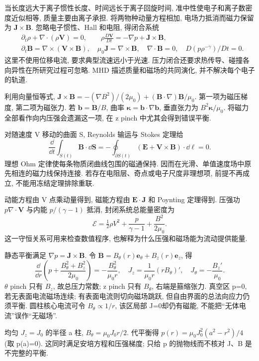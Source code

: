 \label{ch:ideal}
当长度远大于离子惯性长度、时间远长于离子回旋时间, 准中性使电子和离子数密度近似相等, 质量主要由离子承担. 将两物种动量方程相加, 电场力抵消而磁力保留为 $\mathbf J\times\mathbf B$. 忽略电子惯性、Hall 和电阻, 得闭合系统
\begin{align}
 &\partial_t\rho+\nabla\cdot(\rho\mathbf V)=0,\qquad
 \rho\frac{D\mathbf V}{Dt}=-\nabla p+\mathbf J\times\mathbf B,\\
 &\partial_t\mathbf B=\nabla\times(\mathbf V\times\mathbf B),\quad
 \mu_0\mathbf J=\nabla\times\mathbf B,\quad\nabla\cdot\mathbf B=0,\quad
 D(p\rho^{-\gamma})/Dt=0.
\end{align}
这里不使用位移电流, 要求典型流速远小于光速. 压力闭合还要求热传导、碰撞各向异性在所研究过程可忽略. MHD 描述质量和磁场的共同演化, 并不解决每个电子的轨道.

利用向量恒等式, $\mathbf J\times\mathbf B=-(\nabla B^2)/(2\mu_0)+(\mathbf B\cdot\nabla)\mathbf B/\mu_0$. 第一项为磁压梯度, 第二项为磁张力. 若 $\mathbf b=\mathbf B/B$, 曲率 $\boldsymbol\kappa=\mathbf b\cdot\nabla\mathbf b$, 垂直张力为 $B^2\boldsymbol\kappa/\mu_0$. 将磁力全部看作向内压强会遗漏这一项, 在 z pinch 中尤其会得到错误平衡.

对随速度 V 移动的曲面 S, Reynolds 输运与 Stokes 定理给
\begin{equation}
 \frac{\dd}{\dd t}\int_{S(t)}\mathbf B\cdot\dd\mathbf S
 =-\oint_{\partial S(t)}(\mathbf E+\mathbf V\times\mathbf B)\cdot\dd\boldsymbol\ell=0.
\end{equation}
理想 Ohm 定律使每条物质闭曲线包围的磁通保持. 因而在光滑、单值速度场中原先相连的磁力线保持连接. 若存在电阻层、奇点或电子尺度非理想项, 前提不再成立, 不能用冻结定理排除重联.

动能方程由 V 点乘动量得到, 磁能方程由 $\mathbf E\cdot\mathbf J$ 和 Poynting 定理得到. 压强功 $p\nabla\cdot\mathbf V$ 与内能 $p/(\gamma-1)$ 抵消, 封闭系统总能量密度为
\begin{equation}
 \mathcal E=\tfrac12\rho V^2+\frac{p}{\gamma-1}+\frac{B^2}{2\mu_0}.
\end{equation}
这一守恒关系可用来检查数值程序, 也解释为什么压强和磁场能为流动提供能量.

静态平衡满足 $\nabla p=\mathbf J\times\mathbf B$. 令 $\mathbf B=B_\theta(r)\mathbf e_\theta+B_z(r)\mathbf e_z$, 得
\begin{equation}\label{eq:cylbalance}
 \frac{\dd}{\dd r}\left(p+\frac{B_\theta^2+B_z^2}{2\mu_0}\right)
 =-\frac{B_\theta^2}{\mu_0r},\quad
 J_z=\frac1{\mu_0r}(rB_\theta)',\quad J_\theta=-\frac{B_z'}{\mu_0}.
\end{equation}
$\theta$ pinch 只有 $B_z$, 故总压力常数; z pinch 只有 $B_\theta$, 右端是箍缩张力. 真空区 p=0, 若无表面电流磁场连续; 有表面电流则切向磁场跳跃, 但自由界面的总法向应力仍须平衡. 圆柱核心电流可令 $B_\theta\propto1/r$, 该区局部 J=0却仍有磁能, 不能把``无体电流''误作``无磁场''.

\begin{example}
均匀 $J_z=J_0$ 的半径 a 柱, $B_\theta=\mu_0J_0r/2$. 代平衡得 $p(r)=\mu_0J_0^2(a^2-r^2)/4$ (取 p(a)=0). 这同时满足安培方程和压强梯度; 只给 p 的抛物线而不核对 J、B 是不完整的平衡.
\end{example}
